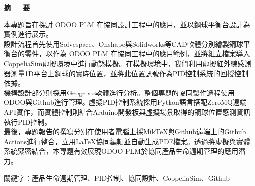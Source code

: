 \renewcommand{\baselinestretch}{1.5} %
\clearpage  %
\sectionef
{} %
\begin{center}
\LARGE\textbf{摘~~~要}\\
\end{center}

\justifying
\fontsize{14pt}{20pt}\sectionef\hspace{12pt}\quad 本專題旨在探討 ODOO PLM 在協同設計工程中的應用，並以鋼球平衡台設計為實例進行展示。\\[14pt]

\fontsize{14pt}{20pt}\sectionef\hspace{12pt}\quad 設計流程首先使用Solvespace、Onshape與Solidworks等CAD軟體分別繪製鋼球平衡台的零件，以作為 ODOO PLM 在協同工程中的應用範例，並將組立檔案導入CoppeliaSim虛擬環境中進行動態模擬。在模擬環境中，我們利用虛擬紅外線感測器測量1D平台上鋼球的實時位置，並將此位置訊號作為PID控制系統的回授控制依據。\\

\fontsize{14pt}{20pt}\sectionef\hspace{12pt}\quad 機構設計部分則採用Geogebra軟體進行分析。整個專題的協同製作過程使用ODOO與Github進行管理。虛擬PID控制系統採用Python語言搭配ZeroMQ遠端API實作，而實體控制則結合Arduino開發板與虛擬場景取得的鋼球位置感測資訊執行PID控制。\\

\fontsize{14pt}{20pt}\sectionef\hspace{12pt}\quad 最後，專題報告的撰寫分別在使用者電腦上採MikTeX與Github遠端上的Github Actions進行整合，立用LaTeX協同編輯並自動生成PDF檔案。透過將虛擬與實體系統緊密結合，本專題有效展現ODOO PLM於協同產品生命週期管理的應用潛力。\\




\vspace{7cm}


\begin{hangparas}{1.5cm}{1}
\fontsize{14pt}{20pt}\sectionef
關鍵字：產品生命週期管理、PID控制、協同設計、CoppeliaSim、Github
\end{hangparas}
\newpage
\begin{center}
\renewcommand{\baselinestretch}{1.5} %
\LARGE\textbf{}\\
\end{center}

